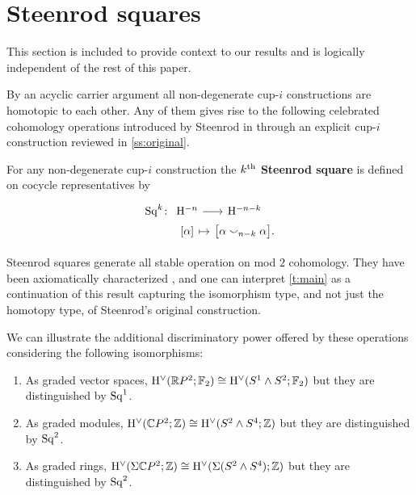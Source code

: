 
\section{Steenrod squares} \label{s:squares}

This section is included to provide context to our results and is logically independent of the rest of this paper.

By an acyclic carrier argument \cite{eilenberg1953acyclic} all non-degenerate \mbox{cup-$i$} constructions are homotopic to each other.
Any of them gives rise to the following celebrated cohomology operations introduced by Steenrod in \cite{steenrod1947products} through an explicit \mbox{cup-$i$} construction reviewed in \cref{ss:original}.

\begin{definition*}
	For any non-degenerate \mbox{cup-$i$} construction the \textbf{$k^{\mathrm{th}}$ Steenrod square} is defined on cocycle representatives by
	\[
	\begin{tikzcd} [column sep=tiny, row sep=0]
	\Sq^k \colon &[-10pt] \rH^{-n} \arrow[r] & \rH^{-n-k} \\
	& {[\alpha]} \arrow[r, mapsto] & \big[ \alpha \cup_{n-k} \alpha \big].
	\end{tikzcd}
	\]
\end{definition*}

Steenrod squares generate all stable operation on mod $2$ cohomology.
They have been axiomatically characterized \cite{steenrod1962cohomology}, and one can interpret \cref{t:main} as a continuation of this result capturing the isomorphism type, and not just the homotopy type, of Steenrod's original construction.

\begin{remark*}
	We can illustrate the additional discriminatory power offered by these operations considering the following isomorphisms:
	\begin{enumerate}
		\item As graded vector spaces, $\mathrm{H}^\vee(\mathbb{R} P^2; {\mathbb{F}_2}) \cong \mathrm{H}^\vee(S^1 \wedge S^2; {\mathbb{F}_2})$
		but they are distinguished by $\mathrm{Sq}^1$.
		\item As graded modules, $\mathrm{H}^\vee(\mathbb C P^2; \mathbb{Z}) \cong \mathrm{H}^\vee(S^2 \wedge S^4; \mathbb{Z})$
		but they are distinguished by $\mathrm{Sq}^2$.
		\item As graded rings, $\mathrm{H}^\vee(\Sigma \mathbb C P^2; \mathbb{Z}) \cong \mathrm{H}^\vee(\Sigma (S^2 \wedge S^4); \mathbb{Z})$
		but they are distinguished by $\mathrm{Sq}^2$.
	\end{enumerate}
\end{remark*}

